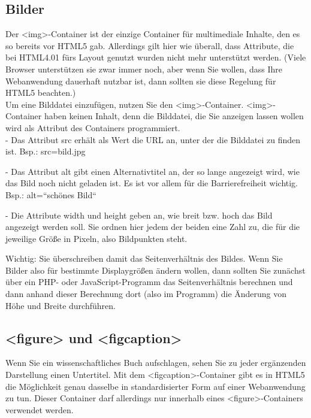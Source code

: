 \subsection{Bilder}

Der <img>-Container ist der einzige Container für multimediale Inhalte, den es so bereits vor HTML5 gab. Allerdings gilt hier wie überall, dass Attribute, die bei HTML4.01 fürs Layout genutzt wurden nicht mehr unterstützt werden. (Viele Browser unterstützen sie zwar immer noch, aber wenn Sie wollen, dass Ihre Webanwendung dauerhaft nutzbar ist, dann sollten sie diese Regelung für HTML5 beachten.)\\

Um eine Bilddatei einzufügen, nutzen Sie den <img>-Container. <img>-Container haben keinen Inhalt, denn die Bilddatei, die Sie anzeigen lassen wollen wird als Attribut des Containers programmiert.\\

-	Das Attribut src erhält als Wert die URL an, unter der die Bilddatei zu finden ist.
Bsp.: src=bild.jpg

-	Das Attribut alt gibt einen Alternativtitel an, der so lange angezeigt wird, wie das Bild noch nicht geladen ist. Es ist vor allem für die Barrierefreiheit wichtig.
Bsp.: alt=“schönes Bild“

-	Die Attribute width und height geben an, wie breit bzw. hoch das Bild angezeigt werden soll. Sie ordnen hier jedem der beiden eine Zahl zu, die für die jeweilige Größe in Pixeln, also Bildpunkten steht. 

Wichtig: Sie überschreiben damit das Seitenverhältnis des Bildes. Wenn Sie Bilder also für bestimmte Displaygrößen ändern wollen, dann sollten Sie zunächst über ein PHP- oder JavaScript-Programm das Seitenverhältnis berechnen und dann anhand dieser Berechnung dort (also im Programm) die Änderung von Höhe und Breite durchführen.

\subsection{<figure> und <figcaption>}

Wenn Sie ein wissenschaftliches Buch aufschlagen, sehen Sie zu jeder ergänzenden Darstellung einen Untertitel. Mit dem <figcaption>-Container gibt es in HTML5 die Möglichkeit genau dasselbe in standardisierter Form auf einer Webanwendung zu tun. Dieser Container darf allerdings nur innerhalb eines <figure>-Containers verwendet werden.\\


